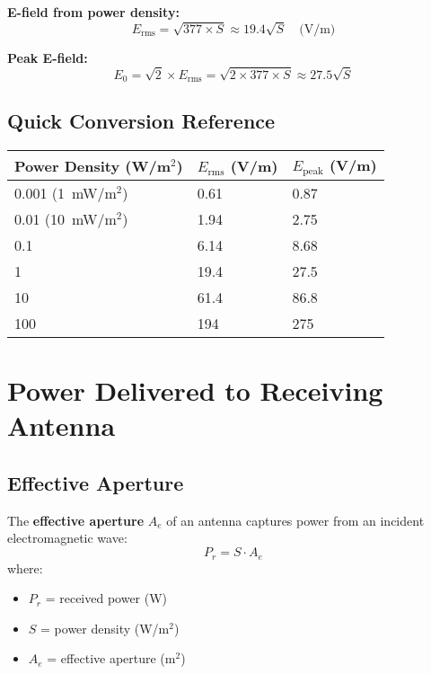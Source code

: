 \textbf{E-field from power density:}
\begin{equation}
E_{\text{rms}} = \sqrt{377 \times S} \approx 19.4\sqrt{S} \quad \text{(V/m)}
\label{eq:e-from-s-conversion}
\end{equation}

\textbf{Peak E-field:}
\begin{equation}
E_0 = \sqrt{2} \times E_{\text{rms}} = \sqrt{2 \times 377 \times S} \approx 27.5\sqrt{S}
\label{eq:e-peak-from-s}
\end{equation}

\subsection{Quick Conversion Reference}

\begin{center}
\begin{tabular}{@{}lll@{}}
\toprule
Power Density (W/m$^2$) & $E_{\text{rms}}$ (V/m) & $E_{\text{peak}}$ (V/m) \\
\midrule
0.001 (1~mW/m$^2$) & 0.61 & 0.87 \\
0.01 (10~mW/m$^2$) & 1.94 & 2.75 \\
0.1 & 6.14 & 8.68 \\
1 & 19.4 & 27.5 \\
10 & 61.4 & 86.8 \\
100 & 194 & 275 \\
\bottomrule
\end{tabular}
\end{center}

\section{Power Delivered to Receiving Antenna}

\subsection{Effective Aperture}

The \textbf{effective aperture} $A_e$ of an antenna captures power from an incident electromagnetic wave:
\begin{equation}
P_r = S \cdot A_e
\label{eq:received-power-aperture}
\end{equation}
where:
\begin{itemize}
\item $P_r$ = received power (W)
\item $S$ = power density (W/m$^2$)
\item $A_e$ = effective aperture (m$^2$)
\end{itemize}

